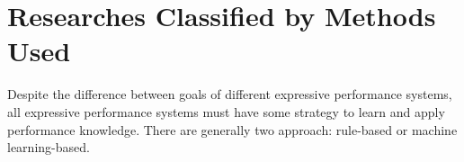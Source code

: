 %
%
%
%

\section{Researches Classified by Methods Used}
Despite the difference between goals of different expressive performance systems, all expressive performance systems must have some strategy to learn and apply performance knowledge. There are generally two approach: rule-based or machine learning-based.

